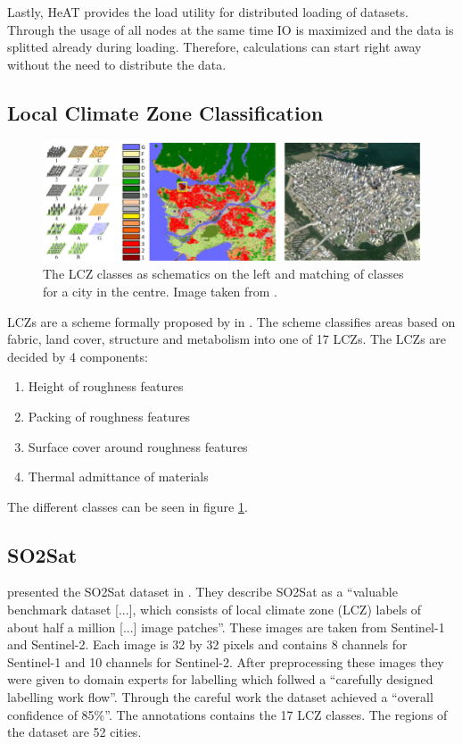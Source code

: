 Lastly, \gls{HeAT} provides the load utility for distributed loading of datasets. Through the usage of all nodes at the same time IO is maximized and the data
is splitted already during loading. Therefore, calculations can start right away without the need to distribute the data.
\cite{krajsek_helmholtz_nodate}


\subsection{Local Climate Zone Classification}
\label{ssec:local_climate_zone_classification}

\begin{figure}[t]
  \centering
  \includegraphics[width=0.9\linewidth]{images/schematic-lcz.png}
  \caption{The LCZ classes as schematics on the left and matching of classes for a city in the centre. Image taken from \cite{zhu_so2sat_2019}.}\label{fig:lcz_classes}
\end{figure}

\gls{LCZ}s are a scheme formally proposed by \citeauthor{stewart_local_2012} in \cite{stewart_local_2012}. The scheme classifies areas based on fabric, land cover, structure
and metabolism into one of 17 \gls{LCZ}s. \cite{xue_applications_2020}
The \gls{LCZ}s are decided by 4 components:
\begin{enumerate}
  \item Height of roughness features
  \item Packing of roughness features
  \item Surface cover around roughness features
  \item Thermal admittance of materials
\end{enumerate}
The different classes can be seen in figure \ref{fig:lcz_classes}.



\subsection{SO2Sat}
\citeauthor{zhu_so2sat_2019} presented the SO2Sat dataset in \cite{zhu_so2sat_2019}. They describe SO2Sat as a \enquote{valuable benchmark dataset [...], which consists of local climate zone (LCZ) labels of about half a million [...] image patches}.
These images are taken from Sentinel-1 and Sentinel-2. Each image is 32 by 32 pixels and contains 8 channels for Sentinel-1 and 10 channels for Sentinel-2.
After preprocessing these images they were given to domain experts for labelling which follwed a \enquote{carefully designed labelling work flow}.
Through the careful work the dataset achieved a \enquote{overall confidence of 85\%}.
The annotations contains the 17 LCZ classes.
The regions of the dataset are 52 cities.

